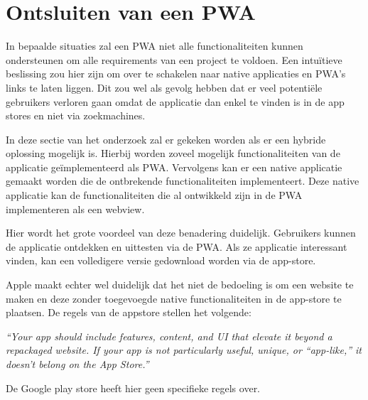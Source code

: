 \section{Ontsluiten van een PWA}
In bepaalde situaties zal een PWA niet alle functionaliteiten kunnen ondersteunen om alle requirements van een project te voldoen. Een intuïtieve beslissing zou hier zijn om over te schakelen naar native applicaties en PWA’s links te laten liggen. Dit zou wel als gevolg hebben dat er veel potentiële gebruikers verloren gaan omdat de applicatie dan enkel te vinden is in de app stores en niet via zoekmachines.

In deze sectie van het onderzoek zal er gekeken worden als er een hybride oplossing mogelijk is. Hierbij worden zoveel mogelijk functionaliteiten van de applicatie geïmplementeerd als PWA. Vervolgens kan er een native applicatie gemaakt worden die de ontbrekende functionaliteiten implementeert. Deze native applicatie kan de functionaliteiten die al ontwikkeld zijn in de PWA implementeren als een webview. 

Hier wordt het grote voordeel van deze benadering duidelijk. Gebruikers kunnen de applicatie ontdekken en uittesten via de PWA. Als ze applicatie interessant vinden, kan een volledigere versie gedownload worden via de app-store.

Apple maakt echter wel duidelijk dat het niet de bedoeling is om een website te maken en deze zonder toegevoegde native functionaliteiten in de app-store te plaatsen. De regels van de appstore stellen het volgende:

\textit{“Your app should include features, content, and UI that elevate it beyond a repackaged website. If your app is not particularly useful, unique, or “app-like,” it doesn’t belong on the App Store.”}
\autocite{Apple2020c}


De Google play store heeft hier geen specifieke regels over.
\autocite{GooglePlay2020a}